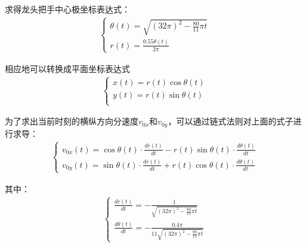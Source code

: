 \documentclass[withoutpreface,bwprint]{cumcmthesis1} %
\begin{document}
求得龙头把手中心极坐标表达式：
\begin{align*}
    \begin{cases}
        \theta(t)=\sqrt{(32\pi)^2-\frac{80}{11}\pi t}\\
        r(t)=\frac{0.55 \theta(t)}{2 \pi} 
    \end{cases}
\end{align*}
\par
相应地可以转换成平面坐标表达式
\begin{align*}
    \begin{cases}
        x(t) = r(t) \cos \theta(t)\\
        y(t) = r(t) \sin \theta(t)\\
    \end{cases}
\end{align*}
\par
为了求出当前时刻的横纵方向分速度$v_{0x}$和$v_{0y}$，可以通过链式法则对上面的式子进行求导：
\begin{align*}
    \begin{cases}
        v_{0x}(t) = \cos\theta(t) \cdot \frac{dr(t)}{dt} - r(t) \sin\theta(t) \cdot \frac{d\theta(t)}{dt} \\
        v_{0y}(t)= \sin\theta(t) \cdot \frac{dr(t)}{dt} + r(t) \cos\theta(t) \cdot \frac{d\theta(t)}{dt}
    \end{cases}
\end{align*}
\par
其中：
\begin{align*}
    \begin{cases}
        \frac{dr(t)}{dt} = -\frac{1}{\sqrt{(32\pi)^2 - \frac{80}{11}\pi t}}\\
        \frac{d\theta(t)}{dt} = -\frac{0.4\pi}{11 \sqrt{(32\pi)^2 - \frac{80}{11}\pi t}}
    \end{cases}
\end{align*}
\end{document}
